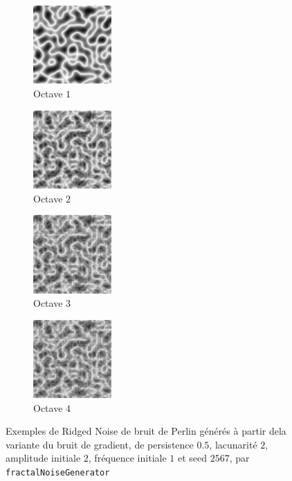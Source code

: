 \documentclass[11pt]{article}
\begin{document}
\begin{figure}[H]
    \centering
    \begin{subfigure}{0.2\textwidth}
    \centering
            \includegraphics[width=3cm]{RIDGED-GRADIENT-O1-P05-L2-IA2-IF1-S2567.png}
        \caption{Octave $1$}
        \label{fig:ridgedGradientO1}
    \end{subfigure}
    \begin{subfigure}{0.2\textwidth}
    \centering
        \includegraphics[width=3cm]{RIDGED-GRADIENT-O2-P05-L2-IA2-IF1-S2567.png}
        \caption{Octave $2$}
        \label{fig:ridgedGradientO2}
    \end{subfigure}
    \begin{subfigure}{0.2\textwidth}
    \centering
        \includegraphics[width=3cm]{RIDGED-GRADIENT-O3-P05-L2-IA2-IF1-S2567.png}
        \caption{Octave $3$}
        \label{fig:ridgedGradientO3}
    \end{subfigure}
    \begin{subfigure}{0.2\textwidth}
    \centering
        \includegraphics[width=3cm]{RIDGED-GRADIENT-O4-P05-L2-IA2-IF1-S2567.png}
        \caption{Octave $4$}
        \label{fig:ridgedGradientO4}
    \end{subfigure}
    \caption{Exemples de Ridged Noise de bruit de Perlin générés à partir dela variante du bruit de gradient, de persistence $0.5$, lacunarité $2$, amplitude initiale $2$, fréquence initiale $1$ et seed $2567$, par \texttt{fractalNoiseGenerator}}
    \label{fig:ridgedGradient}
\end{figure}
\end{document}
